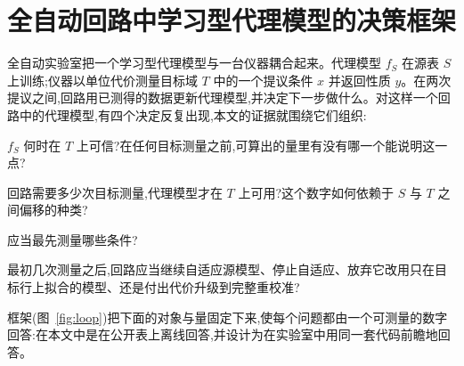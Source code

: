 \documentclass[11pt,a4paper]{ctexart}
\begin{document}
\section{全自动回路中学习型代理模型的决策框架}
\label{sec:framework}

全自动实验室把一个学习型代理模型与一台仪器耦合起来。代理模型 $f_S$ 在源表 $S$ 上训练;仪器以单位代价测量目标域 $T$ 中的一个提议条件 $x$ 并返回性质 $y$。在两次提议之间,回路用已测得的数据更新代理模型,并决定下一步做什么。对这样一个回路中的代理模型,有四个决定反复出现,本文的证据就围绕它们组织:
\begin{description}[leftmargin=*,itemsep=1pt]
\item[Q1 可信度] $f_S$ 何时在 $T$ 上可信?在任何目标测量之前,可算出的量里有没有哪一个能说明这一点?
\item[Q2 预算] 回路需要多少次目标测量,代理模型才在 $T$ 上可用?这个数字如何依赖于 $S$ 与 $T$ 之间偏移的种类?
\item[Q3 采集] 应当最先测量哪些条件?
\item[Q4 决策] 最初几次测量之后,回路应当继续自适应源模型、停止自适应、放弃它改用只在目标行上拟合的模型、还是付出代价升级到完整重校准?
\end{description}
框架(图~\ref{fig:loop})把下面的对象与量固定下来,使每个问题都由一个可测量的数字回答:在本文中是在公开表上离线回答,并设计为在实验室中用同一套代码前瞻地回答。
\end{document}
